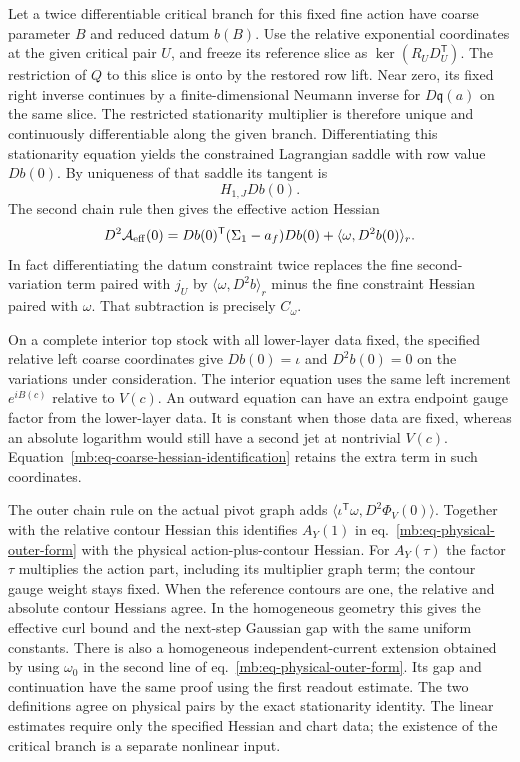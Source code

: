 \documentclass[11pt,letterpaper,reqno]{amsart}
\numberwithin{equation}{section}
\renewcommand{\eqref}[1]{\textup{eq.~\ref{#1}}}
\theoremstyle{definition}
\theoremstyle{remark}
\begin{document}
Let a twice differentiable critical branch for this fixed
fine action have coarse parameter $B$ and reduced datum
$b(B)$. Use the relative exponential coordinates at the
given critical pair $U$, and freeze its reference slice as
$\ker(R_UD_U^{\mathsf T})$. The restriction of $Q$ to this
slice is onto by the restored row lift. Near zero, its
fixed right inverse continues by a finite-dimensional
Neumann inverse for $D\mathfrak q(a)$ on the same slice.
The restricted stationarity multiplier is therefore unique
and continuously differentiable along the given branch.
Differentiating this stationarity equation yields the
constrained Lagrangian saddle with row value $Db(0)$.
By uniqueness of that saddle its tangent is
\[
                         H_{1,J}Db(0).
\]
The second chain rule then gives the effective action
Hessian
\begin{equation}\label{mb:eq-coarse-hessian-identification}
 D^2\mathcal A_{\rm eff}(0)
  =Db(0)^{\mathsf T}(\Sigma_1-a_f)Db(0)
                           +\langle\omega,D^2b(0)\rangle_r .
\end{equation}
In fact differentiating the datum constraint twice
replaces the fine second-variation term paired with
\(j_U\) by \(\langle\omega,D^2 b\rangle_r\) minus the
fine constraint Hessian paired with \(\omega\).
That subtraction is precisely \(C_\omega\).

On a complete interior top stock with all lower-layer
data fixed, the specified relative left coarse coordinates
give \(Db(0)=\iota\) and \(D^2b(0)=0\) on the variations
under consideration. The interior equation uses the same
left increment \(e^{iB(c)}\) relative to \(V(c)\).
An outward equation can have an extra endpoint gauge
factor from the lower-layer data. It is constant when
those data are fixed, whereas an absolute logarithm
would still have a second jet at nontrivial \(V(c)\).
Equation~\ref{mb:eq-coarse-hessian-identification}
retains the extra term in such coordinates.

The outer chain rule on the actual pivot graph adds
\(\langle\iota^{\mathsf T}\omega,D^2\Phi_V(0)\rangle\).
Together with the relative contour Hessian this identifies
$A_Y(1)$ in \eqref{mb:eq-physical-outer-form}
with the physical action-plus-contour Hessian.
For $A_Y(\tau)$ the factor $\tau$ multiplies the
action part, including its multiplier graph term; the
contour gauge weight stays fixed. When the reference contours are
one, the relative and absolute contour Hessians agree.
In the homogeneous geometry this gives the effective curl
bound and the next-step Gaussian gap with the same uniform
constants. There is also a homogeneous independent-current
extension obtained by using \(\omega_0\) in the second line
of \eqref{mb:eq-physical-outer-form}. Its gap and continuation
have the same proof using the first readout estimate.
The two definitions agree on physical pairs by the
exact stationarity identity. The linear estimates require
only the specified Hessian and chart data; the existence
of the critical branch is a separate nonlinear input.
\end{document}
